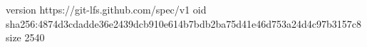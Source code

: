 version https://git-lfs.github.com/spec/v1
oid sha256:4874d3cdadde36e2439dcb910e614b7bdb2ba75d41e46d753a24d4c97b3157c8
size 2540
